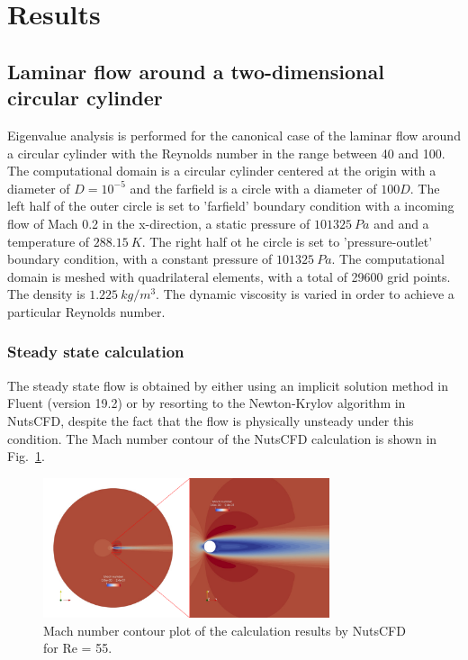 \documentclass[journal,final]{new-aiaa}
\begin{document}
\section{Results}
\label{results}

\subsection{Laminar flow around a two-dimensional circular cylinder}
Eigenvalue analysis is performed for the canonical case of the
laminar flow around a circular cylinder with the Reynolds number in
the range between 40 and 100. The computational domain is a
circular cylinder centered at the origin with a diameter of $D=10^{-5}$
and the farfield is a circle with a diameter of $100D$. The left half of
the outer circle is set to 'farfield' boundary condition with a incoming
flow of Mach 0.2 in the x-direction, a static pressure of $101325~Pa$ and
and a temperature of $288.15~K$.
The right half ot he circle is set to 'pressure-outlet' boundary condition,
with a constant pressure of $101325~Pa$.
The computational domain is meshed with quadrilateral elements,
with a total of 29600 grid points. The density is $1.225~kg/m^3$.
The dynamic viscosity is varied in order to achieve a particular Reynolds number.

\subsubsection{Steady state calculation}
The steady state flow is obtained by either using an implicit solution method in
Fluent (version 19.2) or by resorting to the Newton-Krylov algorithm in NutsCFD,
despite the fact that the flow is physically unsteady under this condition. The
Mach number contour of the NutsCFD calculation is shown in Fig.~\ref{fig:cyl-re55}.

\begin{figure}[htb]
	\centering   
	\includegraphics[width=0.75\textwidth]{pic/cylinder-std.png}
	\caption{Mach number contour plot of the calculation results by NutsCFD for Re = 55.}
	\label{fig:cyl-re55}
\end{figure}
\end{document}
